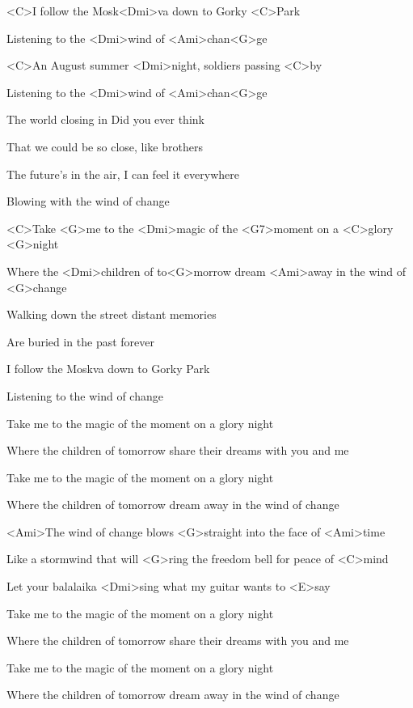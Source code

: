 

\zs
<C>I follow the Mosk<Dmi>va down to Gorky <C>Park

Listening to the <Dmi>wind of <Ami>chan<G>ge

<C>An August summer <Dmi>night, soldiers passing <C>by

Listening to the <Dmi>wind of <Ami>chan<G>ge
\ks

\zs
The world closing in Did you ever think

That we could be so close, like brothers

The future's in the air, I can feel it everywhere

Blowing with the wind of change
\ks

\zr
<C>Take <G>me to the <Dmi>magic of the <G7>moment on a <C>glory <G>night

Where the <Dmi>children of to<G>morrow dream <Ami>away in the wind of <G>change
\kr

\zs
Walking down the street distant memories

Are buried in the past forever

I follow the Moskva down to Gorky Park

Listening to the wind of change
\ks

\zr
Take me to the magic of the moment on a glory night

Where the children of tomorrow share their dreams with you and me

Take me to the magic of the moment on a glory night

Where the children of tomorrow dream away in the wind of change
\kr

\zs
<Ami>The wind of change blows <G>straight into the face of <Ami>time

Like a stormwind that will <G>ring the freedom bell for peace of <C>mind

Let your balalaika <Dmi>sing what my guitar wants to <E>say
\ks

\zr
Take me to the magic of the moment on a glory night

Where the children of tomorrow share their dreams with you and me

Take me to the magic of the moment on a glory night

Where the children of tomorrow dream away in the wind of change
\kr

\kp
